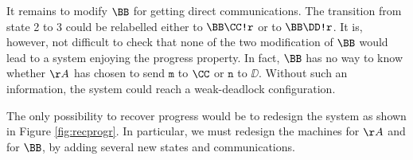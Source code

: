 It remains to modify $\BB$ for getting direct communications.
The transition from state 2 to 3 could be relabelled either to $\BB\CC\texttt{!r}$ or to
$\BB\DD\texttt{!r}$. 
It is, however, not difficult to check that none of the two modification of $\BB$ would lead to a system enjoying the progress property.
In fact, $\BB$ has no way to know whether $\AA$ has chosen to send $\texttt{m}$ to $\CC$ or
$\texttt{n}$ to $\DD$. Without such an information, the system could reach a weak-deadlock configuration.

The only possibility to recover progress would be to redesign the system as shown in Figure \ref{fig:recprogr}.
In particular, we must redesign the machines for $\AA$ and for $\BB$, by adding several new states and communications.






